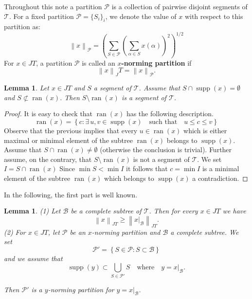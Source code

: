 \documentclass[11pt,a4paper]{amsart}
\newtheorem{lemma}[theorem]{Lemma}
\newcommand{\JT}{JT}
\newcommand{\Tree}{\mathcal{T}}
\newcommand{\norm}[1]{\left\lVert#1\right\rVert}
\newcommand{\supp}{\operatorname{supp}}
\newcommand{\ran}{\operatorname{ran}}
\begin{document}
Throughout this note a partition $\mathcal{P}$ is a collection of pairwise disjoint segments of $\Tree$. For a fixed partition $\mathcal{P} = \{S_i\}_{i}$, we denote the value of $x$ with respect to this partition as:
\[ \norm{x}_{\mathcal{P}} = \left( \sum_{S \in \mathcal{P}} \left( \sum_{\alpha \in S} x(\alpha) \right)^2 \right)^{1/2} \]
For $x\in \JT$, a partition $\mathcal{P}$ is called an \textbf{$x$-norming partition} if 
\[ \norm{x}_\JT = \norm{x}_\mathcal{P}. \]
\begin{lemma} \label{L10} Let $x\in \JT$ and $S$ a segment of $\Tree$. Assume that $S\cap \supp(x) = \emptyset$ and $S \not\subset \ran(x) $.
 Then  $S\setminus \ran(x) $ is a segment of $\Tree$.
 \end{lemma}
 \begin{proof}  It is easy to check that $\ran(x)$ has the following description.
   \[ \ran(x) = \left\{ c: \exists \,u, v \in \supp(x) \quad \text{such that} \quad u \le c \le v \right\} \]
   Observe that the previous implies that every $u \in \ran(x)$ which is either maximal or minimal element of the subtree $\ran(x)$ belongs to $\supp(x).$
   Assume that $S\cap \ran(x) \ne \emptyset$ (otherwise the conclusion is trivial).   Further assume, on the contrary, that 
   $S\setminus \ran(x)$ is not a segment of $\Tree$. We set $I = S\cap \ran(x)$ Since $\min S < \min I$ it follows that
   $ c = \min I$ is a minimal element of the subtree $\ran(x)$ which belongs to $\supp(x)$ a contradiction.
   
   \end{proof}
 

In the following, the first part is well known.

\begin{lemma}\label{lem1}
    (1) Let $\mathcal{B}$ be a complete subtree of $\Tree$. Then for every $x \in \JT$ we have 
    \[ \norm{x}_{\JT} \ge \norm{x|_{\mathcal{B}}}_{\JT}. \]
    (2) For $x\in \JT$, let $\mathcal{P}$ be an $x$-norming partition and $\mathcal{B}$ a complete subtree. We set
     \[  \mathcal{P}' =\left\{ S\in \mathcal{P}: S \subset \mathcal{B} \right\} \]
     and we assume that \[\supp(y)\subset \bigcup_{S\in \mathcal{P}'} S \quad \text{where}\quad y= x|_\mathcal{B}.\]
     
     Then $\mathcal{P}'$ is a $y$-norming partition for $y = x|_{\mathcal{B}}$.
    
\end{lemma}
\end{document}
